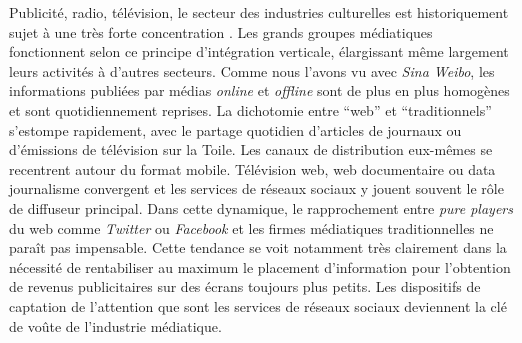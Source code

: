 Publicité, radio, télévision, le secteur des industries culturelles est historiquement sujet à une très forte concentration \citep{Martel2010}. Les grands groupes médiatiques fonctionnent selon ce principe d'intégration verticale, élargissant même largement leurs activités à d'autres secteurs. Comme nous l'avons vu avec \textit{Sina Weibo}, les informations publiées par médias \textit{online} et \textit{offline} sont de plus en plus homogènes et sont quotidiennement reprises. La dichotomie entre ``web'' et ``traditionnels'' s'estompe rapidement, avec le partage quotidien d'articles de journaux ou d'émissions de télévision sur la Toile. Les canaux de distribution eux-mêmes se recentrent autour du format mobile. Télévision web,  web documentaire ou data journalisme convergent et les services de réseaux sociaux y jouent souvent le rôle de diffuseur principal. Dans cette dynamique, le rapprochement entre \textit{pure players} du web comme \textit{Twitter} ou \textit{Facebook} et les firmes médiatiques traditionnelles ne paraît pas impensable. Cette tendance se voit notamment très clairement dans la nécessité de rentabiliser au maximum le placement d'information pour l'obtention de revenus publicitaires sur des écrans toujours plus petits. Les dispositifs de captation de l'attention que sont les services de réseaux sociaux deviennent la clé de voûte de l'industrie médiatique. 

